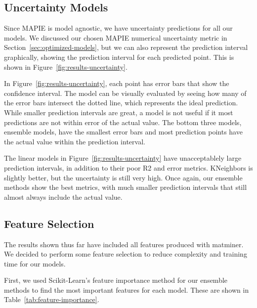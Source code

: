\documentclass[twocolumn, nofootinbib, secnumarabic, amssymb, nobibnotes, aps, prd]{revtex4-2}
\begin{document}
\subsection{Uncertainty Models}
Since MAPIE is model agnostic, we have uncertainty predictions for all our models. We discussed our chosen MAPIE numerical uncertainty metric in Section~\ref{sec:optimized-models}, but we can also represent the prediction interval graphically, showing the prediction interval for each predicted point. This is shown in Figure~\ref{fig:results-uncertainty}.

In Figure~\ref{fig:results-uncertainty}, each point has error bars that show the confidence interval. The model can be visually evaluated by seeing how many of the error bars intersect the dotted line, which represents the ideal prediction. While smaller prediction intervals are great, a model is not useful if it most predictions are not within error of the actual value. The bottom three models, ensemble models, have the smallest error bars and most prediction points have the actual value within the prediction interval. 

The linear models in Figure~\ref{fig:results-uncertainty} have unacceptablely large prediction intervals, in addition to their poor R2 and error metrics. KNeighbors is slightly better, but the uncertainty is still very high. Once again, our ensemble methods show the best metrics, with much smaller prediction intervals that still almost always include the actual value.

\subsection{Feature Selection}
The results shown thus far have included all features produced with matminer. We decided to perform some feature selection to reduce complexity and training time for our models. 

First, we used Scikit-Learn's feature importance method for our ensemble methods to find the most important features for each model. These are shown in Table~\ref{tab:feature-importance}.
\end{document}
